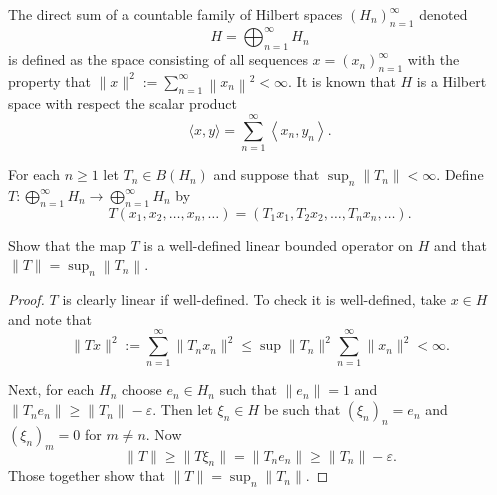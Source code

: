
\begin{problem}
	The direct sum of a countable family of Hilbert spaces $\left(H_n\right)_{n=1}^{\infty}$ denoted
\[
H=\bigoplus_{n=1}^{\infty} H_n
\]
is defined as the space consisting of all sequences $x=\left(x_n\right)_{n=1}^{\infty}$ with the property that $\|x\|^2:=\sum_{n=1}^{\infty}\left\|x_n\right\|^2<\infty$. It is known that $H$ is a Hilbert space with respect the scalar product
\[
\langle x, y\rangle=\sum_{n=1}^{\infty}\left\langle x_n, y_n\right\rangle .
\]

For each $n \geq 1$ let $T_n \in B\left(H_n\right)$ and suppose that $\sup _n\left\|T_n\right\|<\infty$. Define $T: \bigoplus_{n=1}^{\infty} H_n \rightarrow \bigoplus_{n=1}^{\infty} H_n$ by
\[
T\left(x_1, x_2, \ldots, x_n, \ldots\right)=\left(T_1 x_1, T_2 x_2, \ldots, T_n x_n, \ldots\right) .
\]

Show that the map $T$ is a well-defined linear bounded operator on $H$ and that $\|T\|=\sup _n\left\|T_n\right\|$.
\end{problem}
\begin{proof}
	$T$ is clearly linear if well-defined. To check it is well-defined, take $x \in H$ and note that
	\[
		\|T x\|^2 := \sum_{n = 1}^\infty \|T_n x_n\|^2 
		\le \sup \|T_n\|^2 \sum_{n = 1}^\infty  \|x_n\|^2 < \infty 
	.\] 

	Next, for each $H_n$ choose $e_n \in H_n$ such that $\|e_n\| = 1$ and $\|T_n e_n\| \ge \|T_n\| - \varepsilon$. Then let $\xi_n \in H$ be such that $(\xi_n)_n = e_n$ and $(\xi_n)_m = 0$ for $m \neq n$. Now
	\[
		\|T\| \ge \|T \xi_n\| = \|T_n e_n\| \ge  \|T_n\| - \varepsilon
	.\] 
	Those together show that $\|T\| = \sup _n \|T_n\|$.
\end{proof}

